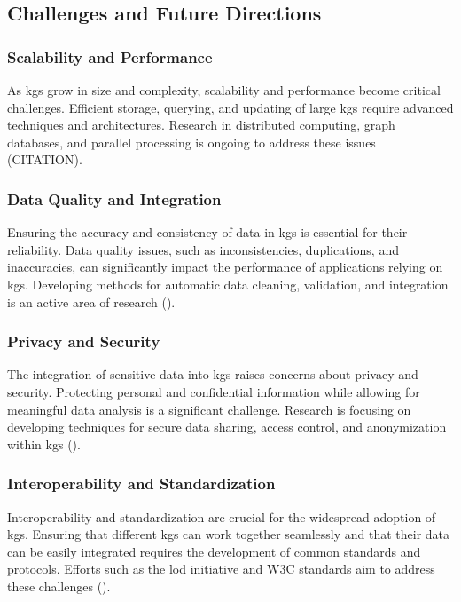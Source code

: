 \subsection*{Challenges and Future Directions}

\subsubsection*{Scalability and Performance}
As \glspl{kg} grow in size and complexity, scalability and performance become critical challenges. Efficient storage, querying, and updating of large \glspl{kg} require advanced techniques and architectures. Research in distributed computing, graph databases, and parallel processing is ongoing to address these issues (CITATION).

\subsubsection*{Data Quality and Integration}

Ensuring the accuracy and consistency of data in \glspl{kg} is essential for their reliability. Data quality issues, such as inconsistencies, duplications, and inaccuracies, can significantly impact the performance of applications relying on \glspl{kg}. Developing methods for automatic data cleaning, validation, and integration is an active area of research (\cite{Paulheim2017}).

\subsubsection*{Privacy and Security}

The integration of sensitive data into \glspl{kg} raises concerns about privacy and security. Protecting personal and confidential information while allowing for meaningful data analysis is a significant challenge. Research is focusing on developing techniques for secure data sharing, access control, and anonymization within \glspl{kg} (\cite{Bonatti2017}).

\subsubsection*{Interoperability and Standardization}

Interoperability and standardization are crucial for the widespread adoption of \glspl{kg}. Ensuring that different \glspl{kg} can work together seamlessly and that their data can be easily integrated requires the development of common standards and protocols. Efforts such as the \gls{lod} initiative and W3C standards aim to address these challenges (\cite{Bizer2023}).

